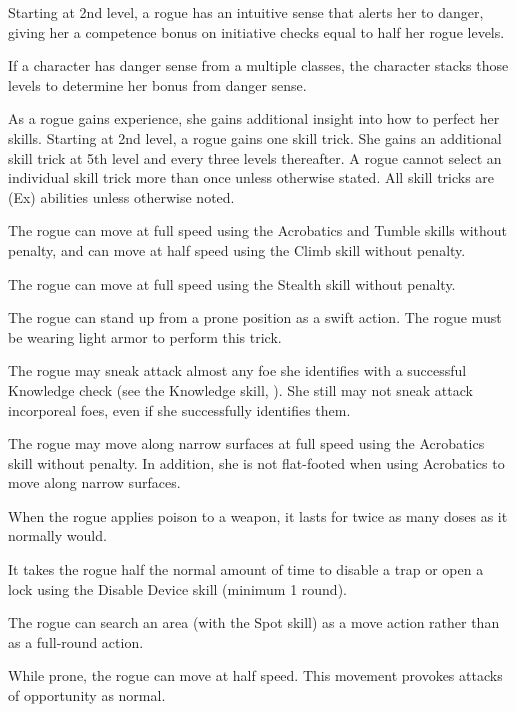  Starting at 2nd level, a rogue has an intuitive sense that alerts her to danger, giving her a competence bonus on initiative checks equal to half her rogue levels.
\par If a character has danger sense from a multiple classes, the character stacks those levels to determine her bonus from danger sense.

 As a rogue gains experience, she gains additional insight into how to perfect her skills. Starting at 2nd level, a rogue gains one skill trick. She gains an additional skill trick at 5th level and every three levels thereafter. A rogue cannot select an individual skill trick more than once unless otherwise stated. All skill tricks are (Ex) abilities unless otherwise noted.

 The rogue can move at full speed using the Acrobatics and Tumble skills without penalty, and can move at half speed using the Climb skill without penalty.

 The rogue can move at full speed using the Stealth skill without penalty.

 The rogue can stand up from a prone position as a swift action. The rogue must be wearing light armor to perform this trick.

 The rogue may sneak attack almost any foe she identifies with a successful Knowledge check (see the Knowledge skill, ). She still may not sneak attack incorporeal foes, even if she successfully identifies them.

 The rogue may move along narrow surfaces at full speed using the Acrobatics skill without penalty. In addition, she is not flat-footed when using Acrobatics to move along narrow surfaces.

 When the rogue applies poison to a weapon, it lasts for twice as many doses as it normally would.

 It takes the rogue half the normal amount of time to disable a trap or open a lock using the Disable Device skill (minimum 1 round).

 The rogue can search an area (with the Spot skill) as a move action rather than as a full-round action.

 While prone, the rogue can move at half speed. This movement provokes attacks of opportunity as normal.

